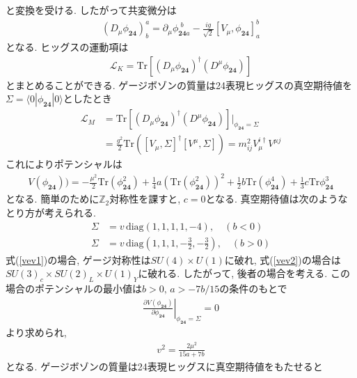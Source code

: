 と変換を受ける.
したがって共変微分は
\begin{align}
  (D_\mu\phi_{\bm{24}})^a_b = \partial_\mu \phi_{\bm{24}a}^{\,\,b}  -\frac{ig}{\sqrt{2}}[V_\mu, \phi_{\bm{24}}]^b_{a}
\end{align}
となる.
ヒッグスの運動項は
\begin{align}
  \mathcal{L}_K = \mathrm{Tr}[(D_\mu \phi_{\bm{24}})^\dagger (D^\mu \phi_{\bm{24}})]
\end{align}
とまとめることができる.
ゲージボゾンの質量は24表現ヒッグスの真空期待値を$\Sigma = \langle 0|\phi_{\bm{24}}| 0\rangle$としたとき
\begin{align}
  \mathcal{L}_M &= \mathrm{Tr}[(D_\mu \phi_{\bm{24}})^\dagger (D^\mu \phi_{\bm{24}})]|_{\phi_{\bm{24}}=\Sigma}\nonumber\\
                &= \frac{g^2}{2}\mathrm{Tr}\left([V_\mu, \Sigma]^\dagger [V^\mu,\Sigma]\right) = m_{ij}^2 V_\mu^{i\dagger}V^{\mu j}
\end{align}
これによりポテンシャルは
\begin{align}
  V(\phi_{\bm{24}})) = -\frac{\mu^2}{2}\mathrm{Tr}(\phi_{\bm{24}}^2) +\frac{1}{4}a(\mathrm{Tr}(\phi_{\bm{24}}^2))^2 + \frac{1}{2}b\mathrm{Tr}(\phi_{\bm{24}}^4) + \frac{1}{3}c\mathrm{Tr}\phi_{\bm{24}}^3\nonumber
\end{align}
となる.
簡単のために$\mathbb{Z}_2$対称性を課すと, $c=0$となる.
真空期待値は次のようなとり方が考えられる.
\begin{align}
  \Sigma &= v\,\mathrm{diag}(1,1,1,1,-4),\quad(b<0)\label{vev1}\\
  \Sigma &= v\,\mathrm{diag}\left(1,1,1,-\frac{3}{2},-\frac{3}{2}\right),\quad(b>0)\label{vev2}
\end{align}
式(\ref{vev1})の場合, ゲージ対称性は$SU(4)\times U(1)$に破れ, 式(\ref{vev2})の場合は$SU(3)_c\times SU(2)_L\times U(1)_Y$に破れる.
したがって, 後者の場合を考える.
この場合のポテンシャルの最小値は$b>0,\, a>-{7b}/{15}$の条件のもとで
\begin{align}
  \left.\frac{\partial V(\phi_{\bm{24}})}{\partial \phi_{\bm{24}}} \right|_{\phi_{\bm{24}}=\Sigma} = 0
\end{align}
より求められ, 
\begin{align}
  v^2 = \frac{2\mu^2}{15a+7b}\nonumber
\end{align}
となる.
ゲージボゾンの質量は24表現ヒッグスに真空期待値をもたせると
